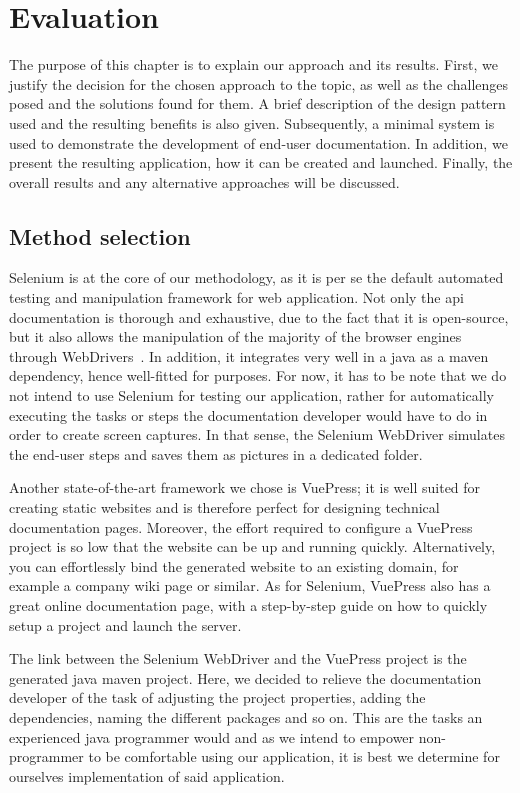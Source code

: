 \chapter{Evaluation}\label{ch:eval}
The purpose of this chapter is to explain our approach and its results. First, we justify the decision for the chosen approach to the topic, as well as the challenges posed and the solutions found for them. A brief description of the design pattern used and the resulting benefits is also given. Subsequently, a minimal system is used to demonstrate the development of end-user documentation. In addition, we present the resulting application, how it can be created and launched. Finally, the overall results and any alternative approaches will be discussed.

\section{Method selection}\label{sec:meth}

Selenium is at the core of our methodology, as it is per se the default automated testing and manipulation framework for web application. Not only the \acrshort{api} documentation is thorough and exhaustive, due to the fact that it is open-source, but it also allows the manipulation of the majority of the browser engines through WebDrivers~\cite{sel}. In addition, it integrates very well in a java as a maven dependency, hence well-fitted for purposes. For now, it has to be note that we do not intend to use Selenium for testing our application, rather for automatically executing the tasks or steps the documentation developer would have to do in order to create screen captures. In that sense, the Selenium WebDriver simulates the end-user steps and saves them as pictures in a dedicated folder.

Another state-of-the-art framework we chose is VuePress; it is well suited for creating static websites and is therefore perfect for designing technical documentation pages. Moreover, the effort required to configure a VuePress project is so low that the website can be up and running quickly. Alternatively, you can effortlessly bind the generated website to an existing domain, for example a company wiki page or similar. As for Selenium, VuePress also has a great online documentation page, with a step-by-step guide on how to quickly setup a project and launch the server.

The link between the Selenium WebDriver and the VuePress project is the generated java maven project. Here, we decided to relieve the documentation developer of the task of adjusting the project properties, adding the dependencies, naming the different packages and so on. This are the tasks an experienced java programmer would and as we intend to empower non-programmer to be comfortable using our application, it is best we determine for ourselves implementation of said application.

